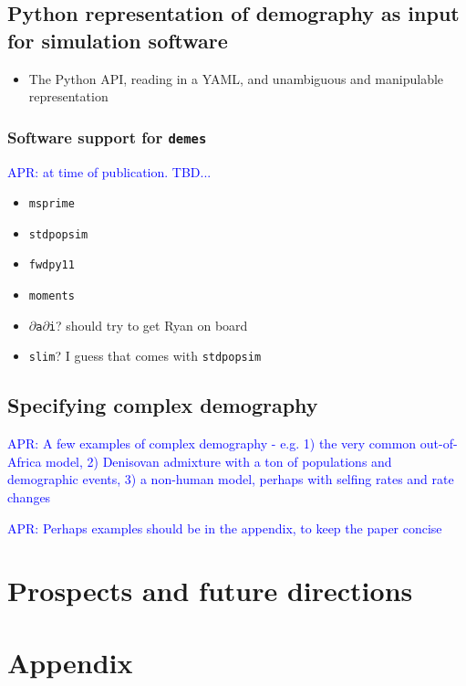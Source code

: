 \documentclass[11pt]{article}
\newcommand{\msprime}[0]{\texttt{msprime}}
\newcommand{\stdpopsim}[0]{\texttt{stdpopsim}}
\newcommand{\demes}[0]{\texttt{demes}}
\newcommand{\moments}[0]{\texttt{moments}}
\newcommand{\dadi}[0]{\texttt{$\partial$a$\partial$i}}
\newcommand{\fwdpy}[0]{\texttt{fwdpy11}}
\newcommand{\slim}[0]{\texttt{slim}}
\newcommand{\aprcomment}[1]{{\textcolor{blue}{APR: #1}}}
\begin{document}
\subsection*{Python representation of demography as input for simulation software}

\begin{itemize}
\item The Python API, reading in a YAML, and unambiguous and manipulable representation
\end{itemize}

\subsubsection*{Software support for \demes}
\aprcomment{at time of publication. TBD...}
\begin{itemize}
\item \msprime
\item \stdpopsim
\item \fwdpy
\item \moments
\item \dadi? should try to get Ryan on board
\item \slim? I guess that comes with \stdpopsim
\end{itemize}

\subsection*{Specifying complex demography}

\aprcomment{A few examples of complex demography - e.g. 1) the very common out-of-Africa
model, 2) Denisovan admixture with a ton of populations and demographic events, 3) a
non-human model, perhaps with selfing rates and rate changes}

\aprcomment{Perhaps examples should be in the appendix, to keep the paper concise}

\section*{Prospects and future directions}




\section*{Appendix}
\end{document}

